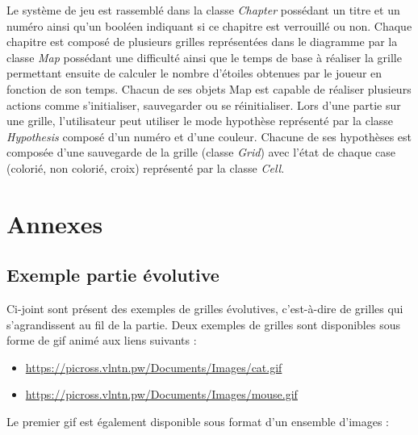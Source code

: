 \documentclass{report}
\begin{document}
 	Le système de jeu est rassemblé dans la classe \textit{Chapter} possédant un titre et un numéro ainsi qu’un booléen indiquant si ce chapitre est verrouillé ou non. Chaque chapitre est composé de plusieurs grilles représentées dans le diagramme par la classe \textit{Map} possédant une difficulté ainsi que le temps de base à réaliser la grille permettant ensuite de calculer le nombre d’étoiles obtenues par le joueur en fonction de son temps. Chacun de ses objets Map est capable de réaliser plusieurs actions comme s’initialiser, sauvegarder ou se réinitialiser. Lors d’une partie sur une grille, l’utilisateur peut utiliser le mode hypothèse représenté par la classe \textit{Hypothesis} composé d’un numéro et d’une couleur. Chacune de ses hypothèses est composée d’une sauvegarde de la grille (classe \textit{Grid}) avec l’état de chaque case (colorié, non colorié, croix) représenté par la classe \textit{Cell}.


\chapter{Annexes}

		\section{Exemple partie évolutive}
	
		Ci-joint sont présent des exemples de grilles évolutives, c'est-à-dire de grilles qui s'agrandissent au fil de la partie.
		Deux exemples de grilles sont disponibles sous forme de gif animé aux liens suivants :
		 \begin{itemize}
    		 \item \url{https://picross.vlntn.pw/Documents/Images/cat.gif}
   	   	 \item \url{https://picross.vlntn.pw/Documents/Images/mouse.gif}
		 \end{itemize}
		
		Le premier gif est également disponible sous format d'un ensemble d'images :
	
\end{document}
